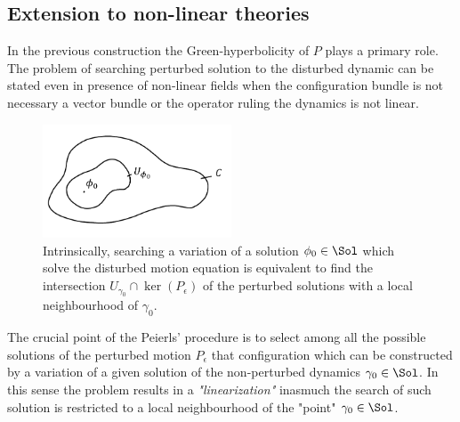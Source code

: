 \documentclass[Main]{subfiles}
\begin{document}
	\subsection{Extension to non-linear theories}\label{Section:NonLinearPeierls}
		In the previous construction the Green-hyperbolicity of $P$ plays a primary role.
		The problem of searching perturbed solution to the disturbed dynamic can be stated even in presence  of non-linear fields  when the configuration bundle is not necessary a vector bundle or the operator ruling the dynamics is not linear.
		\begin{figure}[h!]
				  \centering
			   	\includegraphics[width=0.5\textwidth]{Pictures/Linearization} 
   	  			\caption{Intrinsically, searching a variation of a solution $\phi_0\in \Sol$ which solve the disturbed motion equation is equivalent to find the intersection $U_{\gamma_0}\cap\ker(P_\epsilon)$ of the perturbed solutions with a local neighbourhood of $\gamma_0$.}
		\end{figure}		
		
		The crucial point of the Peierls' procedure  is to select among all the possible solutions of the perturbed motion $P_\epsilon$ that configuration which can be constructed by a variation of a given solution of the non-perturbed dynamics $\gamma_0 \in \Sol$.
		In this sense the problem results in a \emph{"linearization"} inasmuch the  search of such solution is restricted to a local neighbourhood of the "point" $\gamma_0\in \Sol$.
\end{document}
